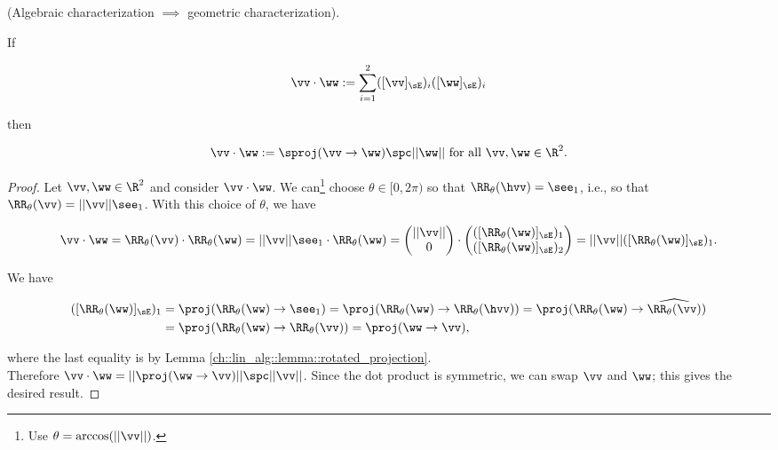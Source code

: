 \begin{deriv}
    (Algebraic characterization $\implies$ geometric characterization).
    
    If

    \begin{align*}
        \vv \cdot \ww := \sum_{i = 1}^2 ([\vv]_\sE)_i ([\ww]_\sE)_i
    \end{align*}

    then
    
    \begin{align*}
        \vv \cdot \ww := \sproj(\vv \rightarrow \ww) \spc ||\ww|| \text{ for all $\vv, \ww \in \R^2$}.
    \end{align*}
\end{deriv}

\begin{proof}
    Let $\vv, \ww \in \R^2$ and consider $\vv \cdot \ww$. We can\footnote{Use $\theta = \arccos(||\vv||)$.} choose $\theta \in [0, 2\pi)$ so that $\RR_\theta(\hvv) = \see_1$, i.e., so that $\RR_\theta(\vv) = ||\vv||\see_1$. With this choice of $\theta$, we have
    
    \begin{align*}
        \vv \cdot \ww 
        = \RR_\theta(\vv) \cdot \RR_\theta(\ww) 
        = ||\vv|| \see_1 \cdot \RR_\theta(\ww)
        = 
        \begin{pmatrix} ||\vv|| \\ 0 \end{pmatrix}
        \cdot 
        \begin{pmatrix} ([\RR_\theta(\ww)]_\sE)_1 \\ ([\RR_\theta(\ww)]_\sE)_2 \end{pmatrix} 
        = 
        ||\vv|| ([\RR_\theta(\ww)]_\sE)_1.
    \end{align*}
    
    We have
    
    \begin{align*}
        ([\RR_\theta(\ww)]_\sE)_1
        &= \proj(\RR_\theta(\ww) \rightarrow \see_1) 
        = \proj(\RR_\theta(\ww) \rightarrow \RR_\theta(\hvv))
        = \proj(\RR_\theta(\ww) \rightarrow \widehat{\RR_\theta(\vv)}) \\
        &= \proj(\RR_\theta(\ww) \rightarrow \RR_\theta(\vv)) 
        = \proj(\ww \rightarrow \vv),
    \end{align*}
    
    where the last equality is by Lemma \ref{ch::lin_alg::lemma::rotated_projection}. \\ Therefore $\vv \cdot \ww = ||\proj(\ww \rightarrow \vv)|| \spc ||\vv||$. Since the dot product is symmetric, we can swap $\vv$ and $\ww$; this gives the desired result.
\end{proof}

